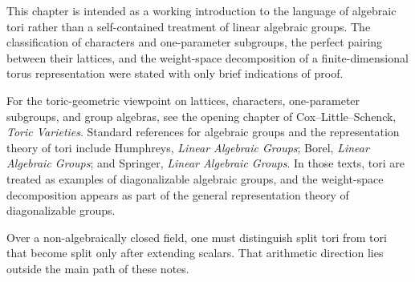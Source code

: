 This chapter is intended as a working introduction to the language of
algebraic tori rather than a self-contained treatment of linear
algebraic groups. The classification of characters and
one-parameter subgroups, the perfect pairing between their lattices,
and the weight-space decomposition of a finite-dimensional torus
representation were stated with only brief indications of proof.

For the toric-geometric viewpoint on lattices, characters,
one-parameter subgroups, and group algebras, see the opening chapter
of Cox--Little--Schenck, \emph{Toric Varieties}. Standard references
for algebraic groups and the representation theory of tori include
Humphreys, \emph{Linear Algebraic Groups}; Borel,
\emph{Linear Algebraic Groups}; and Springer,
\emph{Linear Algebraic Groups}. In those texts, tori are treated as
examples of diagonalizable algebraic groups, and the weight-space
decomposition appears as part of the general representation theory of
diagonalizable groups.

Over a non-algebraically closed field, one must distinguish split
tori from tori that become split only after extending scalars. That
arithmetic direction lies outside the main path of these notes.
